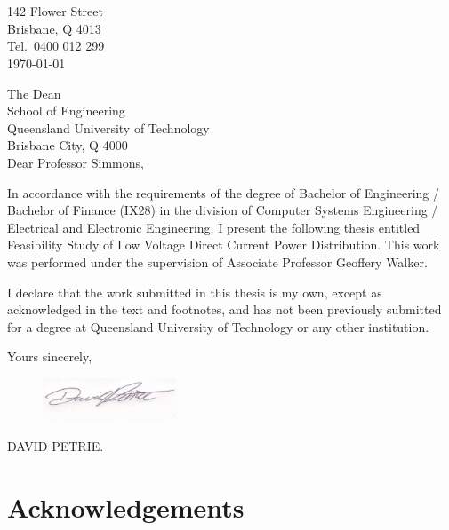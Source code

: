 \newpage


\section*{}

\begin{flushright}
	142 Flower Street\\
	Brisbane, Q 4013\\
	Tel.\ 0400 012 299\\
	\medskip
	\today
\end{flushright}
\begin{flushleft}
  The Dean\\
  School of Engineering\\
  Queensland University of Technology\\
  Brisbane City, Q 4000\\
  \bigskip\bigskip
  Dear Professor Simmons,
\end{flushleft}

In accordance with the requirements of the degree of Bachelor of
Engineering / Bachelor of Finance (IX28) in the division of Computer Systems
Engineering / Electrical and Electronic Engineering, I present the
following thesis entitled Feasibility Study of Low Voltage Direct Current Power Distribution.  This work was performed under the supervision of Associate Professor Geoffery Walker.

I declare that the work submitted in this thesis is my own, except as
acknowledged in the text and footnotes, and has not been previously
submitted for a degree at Queensland University of Technology or any other
institution.

\begin{flushright}
	Yours sincerely,\\
	\medskip
	\begin{figure}[H]
	\hfill\includegraphics[width = 40mm]{images/Signature}%
	\end{figure} 
	\medskip
	DAVID PETRIE.
\end{flushright}

\newpage

\section*{Acknowledgements}

